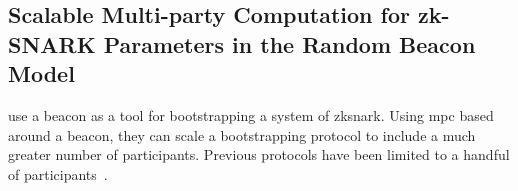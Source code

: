 \subsection{Scalable Multi-party Computation for zk-SNARK Parameters in the Random Beacon Model}
\label{sub:scalable_mpc_zk_snarks}
\citet{mpcsnarks} use a beacon as a tool for bootstrapping a system of \gls{zksnark}.
Using \gls{mpc} based around a beacon, they can scale a bootstrapping protocol to include a much greater number of participants.
Previous protocols have been limited to a handful of participants~\cite{snarkparameters}.
